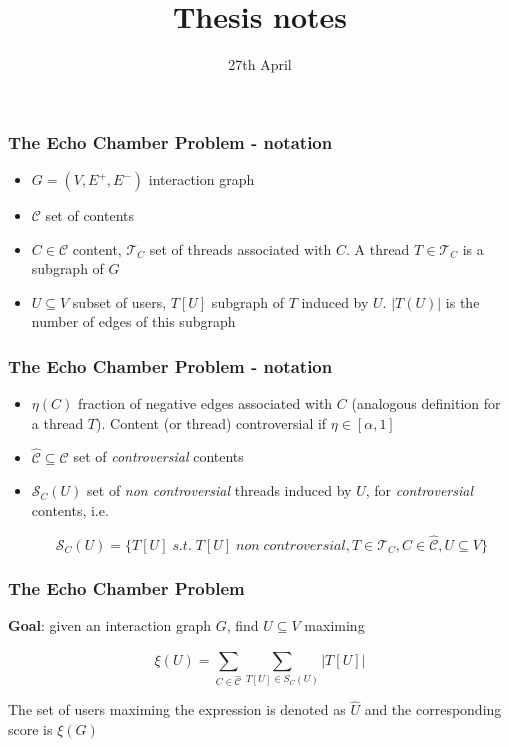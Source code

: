 \documentclass{beamer}
\title{Thesis notes}
\date{27th April}
\begin{document}
\frame{\titlepage}

\begin{frame}[c]
	\frametitle{The Echo Chamber Problem - notation}

	\begin{itemize}
		\item $G = (V, E ^{+}, E ^{-}) $ interaction graph
		\item $ \mathcal{C} $ set of contents
		\item $C \in \mathcal{C} $ content, $\mathcal{T} _{C} $ set of threads
		      associated with $C$. A thread $T \in \mathcal{T} _{C} $ is a
		      subgraph of $G$
		\item $U \subseteq V$ subset of users, $T[U]$ subgraph of $T$ induced
		      by $U$. $|T(U)|$ is the number of edges of this subgraph
	\end{itemize}
\end{frame}

\begin{frame}[c]
	\frametitle{The Echo Chamber Problem - notation}
	\begin{itemize}
		\item $\eta(C)$ fraction of negative edges associated with $C$
		      (analogous definition for a thread $T$). Content (or thread)
		      controversial if $\eta \in [\alpha, 1]$
		\item $\hat{\mathcal{C} } \subseteq \mathcal{C} $ set of \textit{controversial}
		      contents

		\item $\mathcal{S} _C (U)$ set of \textit{non controversial} threads
		      induced by $U$, for \textit{controversial} contents, i.e.

			      {\small
				      \begin{equation}
					      \mathcal{S} _{C} (U) = \{ T[U] \; s.t. \; T[U] \; non \;
					      controversial, T \in \mathcal{T} _{C}, C
					      \in \hat{\mathcal{C}}, U \subseteq V\}
				      \end{equation}
			      }
	\end{itemize}

\end{frame}

\begin{frame}[c]
	\frametitle{The Echo Chamber Problem}
	\textbf{Goal}: given an interaction graph $G$, find $U \subseteq V$ maximing

	\begin{equation}
		\xi (U) = \sum^{}_{C \in \hat{\mathcal{C}} } \sum^{}_{T[U] \in S_C (U)}
		| T[U] |
	\end{equation}

	The set of users maximing the expression is denoted as $\hat{U}$ and the
	corresponding score is $\xi(G)$
\end{frame}
\end{document}
